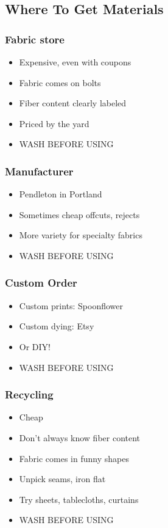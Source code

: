 \documentclass{beamer}
\begin{document}
\subsection{Where To Get Materials}

\begin{frame}[fragile]
\frametitle{Fabric store}
\begin{itemize}[<+(1)->]
\item Expensive, even with coupons
\item Fabric comes on bolts
\item Fiber content clearly labeled
\item Priced by the yard
\item WASH BEFORE USING
\end{itemize}
\end{frame}

\begin{frame}[fragile]
\frametitle{Manufacturer}
\begin{itemize}[<+(1)->]
\item Pendleton in Portland
\item Sometimes cheap offcuts, rejects
\item More variety for specialty fabrics
\item WASH BEFORE USING
\end{itemize}
\end{frame}

\begin{frame}[fragile]
\frametitle{Custom Order}
\begin{itemize}[<+(1)->]
\item Custom prints: Spoonflower
\item Custom dying: Etsy
\item Or DIY!
\item WASH BEFORE USING
\end{itemize}
\end{frame}

\begin{frame}[fragile]
\frametitle{Recycling}
\begin{itemize}[<+(1)->]
\item Cheap
\item Don't always know fiber content
\item Fabric comes in funny shapes
\item Unpick seams, iron flat
\item Try sheets, tablecloths, curtains
\item WASH BEFORE USING
\end{itemize}
\end{frame}
\end{document}
